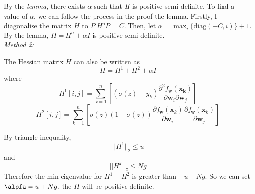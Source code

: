 \documentclass{article}
\begin{document}
By the \textit{lemma}, there exists $\alpha$ such that $H$ is positive semi-definite. To find a value of $\alpha$, we can follow the process in the proof the lemma. Firstly, I diagonalize the matrix $H$ to $P'H^oP = C$. Then, let $\alpha = \max_i\{\text{diag}(-C, i)\} + 1$. By the lemma, $H = H^o + \alpha I$ is positive semi-definite.
\\
\textit{Method 2: }

The Hessian matrix $H$ can also be written as 
\begin{equation}
    H = H^1 +  H^2 + \alpha I
\end{equation}
where
\begin{equation}
    H^1[i,j] =  \sum_{k=1}^n \left[ (\sigma(z) - y_k )  \frac{\partial^{2} f_{\mathrm{w}}(\mathbf{x_k})}{\partial \mathbf{w}_{i} \partial \mathbf{w}_{j}}  \right]
\end{equation}
\begin{equation}
    H^2[i,j] =  \sum_{k=1}^n \left[  \sigma(z)(1-\sigma(z)) \frac{\partial f_{\mathbf{w}}\left(\mathbf{x}_{k}\right) }{\partial \mathbf{w}_i} \frac{\partial f_{\mathbf{w}}\left(\mathbf{x}_{k}\right) }{\partial \mathbf{w}_j} \right]
\end{equation}

By triangle inequality,
\begin{equation}
    ||H^1||_2 \leq  u
\end{equation}
and
\begin{equation}
    ||H^2||_2 \leq  Ng
\end{equation}
Therefore the min eigenvalue for $H^1 +H^2$ is greater than $- u - Ng$. So we can set $\alpfa = u + Ng$, the $H$ will be positive definite.

\begin{comment}
\begin{equation}
    \alpha > \max_i \left\{-\sum_{k=1}^{n}\left[\left(y_{k}-\frac{1}{1+\exp \left(-f_{\mathbf{w}}\left(\mathbf{x}_{k}\right)\right)}\right) \frac{\partial^{2} f_{\mathbf{w}}\left(\mathbf{x}_{\mathbf{k}}\right)}{\partial \mathbf{w}_{i} \partial \mathbf{w}_{i}}\right]\right\}
\end{equation}
\end{comment}
\end{document}
